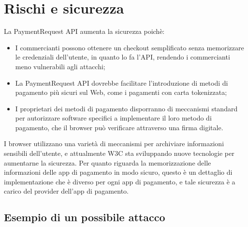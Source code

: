 \documentclass[italian]{article}
\begin{document}
	\section{Rischi e sicurezza}
	La PaymentRequest API aumenta la sicurezza poichè:
	\begin{itemize}
		\item I commercianti possono ottenere un checkout semplificato senza memorizzare le credenziali dell'utente, in quanto lo fa l'API, rendendo i commercianti meno vulnerabili agli attacchi;
		\item La PaymentRequest API dovrebbe facilitare l'introduzione di metodi di pagamento più sicuri sul Web, come i pagamenti con carta tokenizzata;
		\item I proprietari dei metodi di pagamento disporranno di meccanismi standard per autorizzare software specifici a implementare il loro metodo di pagamento, che il browser può verificare attraverso una firma digitale.
	\end{itemize}
	I browser utilizzano una varietà di meccanismi per archiviare informazioni sensibili dell'utente, e attualmente W3C sta sviluppando nuove tecnologie per aumentarne la sicurezza.
	Per quanto riguarda la memorizzazione delle informazioni delle app di pagamento in modo sicuro, questo è un dettaglio di implementazione che è diverso per ogni app di pagamento, e tale sicurezza è a carico del provider dell'app di pagamento.
	
	\subsection{Esempio di un possibile attacco}
\end{document}
